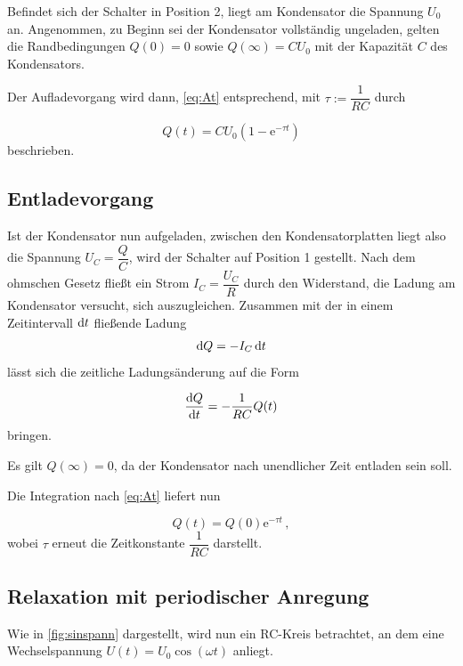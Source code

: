 Befindet sich der Schalter in Position 2, liegt am Kondensator die Spannung $U_0$ an.
Angenommen, zu Beginn sei der Kondensator vollständig ungeladen, gelten die Randbedingungen $Q(0) = 0$ sowie $Q(\infty) = C U_0$ mit der Kapazität $C$ des Kondensators.

Der Aufladevorgang wird dann, \eqref{eq:At} entsprechend, mit $τ := \dfrac{1}{RC}$ durch

\begin{equation}
    Q(t) = C U_0 (1 - \text{e}^{-τ t})
    \label{eq:aufladung}
\end{equation} beschrieben.


\subsection{Entladevorgang}

Ist der Kondensator nun aufgeladen, zwischen den Kondensatorplatten liegt also die Spannung $U_C = \dfrac{Q}{C}$, wird der Schalter auf Position 1 gestellt.
Nach dem ohmschen Gesetz fließt ein Strom $I_C = \dfrac{U_C}{R}$ durch den Widerstand, die Ladung am Kondensator versucht, sich auszugleichen.
Zusammen mit der in einem Zeitintervall $\mathrm{d} t$ fließende Ladung
\begin{equation}
    \mathrm{d} Q = -I_C \,\mathrm{d} t
    \label{eq:difQ}
\end{equation} lässt sich die zeitliche Ladungsänderung auf die Form

\begin{equation}
    \frac{\mathrm{d} Q}{\mathrm{d} t} = -\frac{1}{RC} Q(t)
\end{equation} bringen.

Es gilt $Q(\infty) = 0$, da der Kondensator nach unendlicher Zeit entladen sein soll.

Die Integration nach \eqref{eq:At} liefert nun

\begin{equation}
    Q(t) = Q(0) \text{e}^{-τ t}\,,
\end{equation} wobei $τ$ erneut die Zeitkonstante $\dfrac{1}{RC}$ darstellt.


\subsection{Relaxation mit periodischer Anregung}

Wie in \autoref{fig:sinspann} dargestellt, wird nun ein RC-Kreis betrachtet, an dem eine Wechselspannung $U(t) = U_0 \cos(ω t)$ anliegt.

